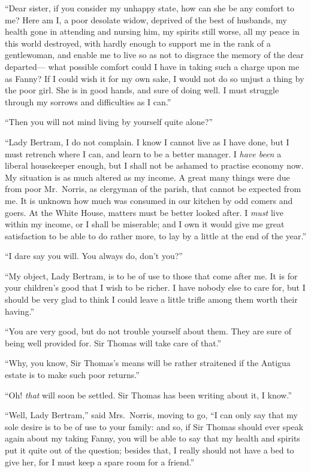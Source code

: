``Dear sister, if you consider my unhappy state, how can she
be any comfort to me?  Here am I, a poor desolate widow,
deprived of the best of husbands, my health gone in attending
and nursing him, my spirits still worse, all my peace
in this world destroyed, with hardly enough to support
me in the rank of a gentlewoman, and enable me to live
so as not to disgrace the memory of the dear departed---%
what possible comfort could I have in taking such a charge
upon me as Fanny?  If I could wish it for my own sake,
I would not do so unjust a thing by the poor girl.
She is in good hands, and sure of doing well.  I must
struggle through my sorrows and difficulties as I can.''

``Then you will not mind living by yourself quite alone?''

``Lady Bertram, I do not complain.  I know I cannot
live as I have done, but I must retrench where I can,
and learn to be a better manager.  I \emph{have been}
a liberal housekeeper enough, but I shall not be ashamed
to practise economy now.  My situation is as much
altered as my income.  A great many things were due
from poor Mr.\ Norris, as clergyman of the parish,
that cannot be expected from me.  It is unknown how much
was consumed in our kitchen by odd comers and goers.
At the White House, matters must be better looked after.
I \emph{must} live within my income, or I shall be miserable;
and I own it would give me great satisfaction to be able
to do rather more, to lay by a little at the end of
the year.''

``I dare say you will.  You always do, don't you?''

``My object, Lady Bertram, is to be of use to those that
come after me.  It is for your children's good that I
wish to be richer.  I have nobody else to care for,
but I should be very glad to think I could leave a little
trifle among them worth their having.''

``You are very good, but do not trouble yourself about them.
They are sure of being well provided for.  Sir Thomas
will take care of that.''

``Why, you know, Sir Thomas's means will be rather straitened
if the Antigua estate is to make such poor returns.''

``Oh! \emph{that} will soon be settled.  Sir Thomas has been
writing about it, I know.''

``Well, Lady Bertram,'' said Mrs.\ Norris, moving to go,
``I can only say that my sole desire is to be of use
to your family:  and so, if Sir Thomas should ever speak
again about my taking Fanny, you will be able to say that
my health and spirits put it quite out of the question;
besides that, I really should not have a bed to give her,
for I must keep a spare room for a friend.''


